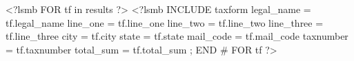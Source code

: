 \documentclass[usletter]{article}
\begin{document}
<?lsmb FOR tf in results ?>
<?lsmb INCLUDE taxform
legal_name = tf.legal_name
line_one = tf.line_one
line_two = tf.line_two
line_three = tf.line_three
city = tf.city
state = tf.state
mail_code = tf.mail_code
taxnumber = tf.taxnumber
total_sum = tf.total_sum ;
END # FOR tf  ?>
\end{document}
